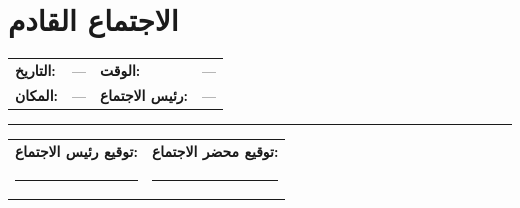 \documentclass[11pt,a4paper]{article}
\begin{document}
\section{الاجتماع القادم}
\label{sec:next}

\begin{table}[H]
\centering
\renewcommand{\arraystretch}{1.4}
\begin{tabularx}{\textwidth}{L{3.5cm} X L{3.5cm} X}
\toprule
\textbf{التاريخ:} & --- & \textbf{الوقت:} & --- \\
\textbf{المكان:} & --- & \textbf{رئيس الاجتماع:} & --- \\
\bottomrule
\end{tabularx}
\end{table}

\vspace{1em}

\noindent\rule{\textwidth}{0.4pt}

\vspace{0.5em}

\noindent
\begin{tabularx}{\textwidth}{X X}
\textbf{توقيع رئيس الاجتماع:} & \textbf{توقيع محضر الاجتماع:} \\[2em]
\rule{6cm}{0.3pt} & \rule{6cm}{0.3pt} \\
\end{tabularx}
\end{document}
